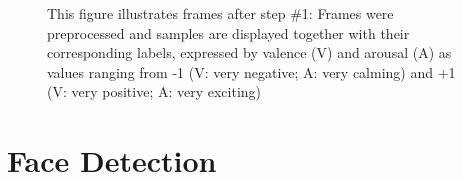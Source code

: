 \begin{figure}[H]
  \hfill
  \caption[ER pipeline step \#1: Preprocessing]{This figure illustrates frames after step \#1: Frames were preprocessed and samples are displayed together with their corresponding labels, expressed by valence (V) and arousal (A) as values ranging from -1 (V: very negative; A: very calming) and +1 (V: very positive; A: very exciting)}
  \label{fig:MethodologyPreprocess}
\end{figure}



\section{Face Detection} \label{sec:FaceDetection}

